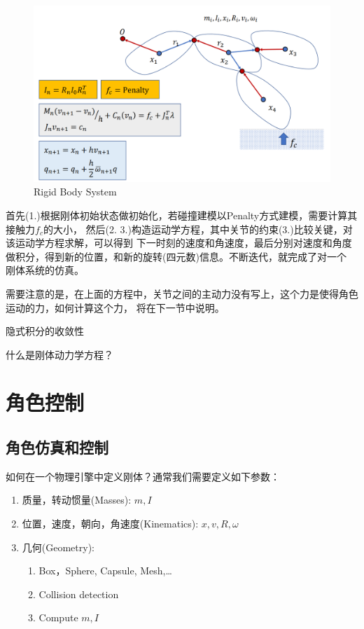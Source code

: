 \documentclass[lang=cn,newtx,10pt,scheme=chinese]{elegantbook}
\begin{document}
\begin{figure}[htbp]
  \centering
  \includegraphics[totalheight=2in]{"./image/RigidBodySystem.png"}
  \caption{Rigid Body System} \label{fig:RigidBodySystem}
\end{figure}
首先(1.)根据刚体初始状态做初始化，若碰撞建模以Penalty方式建模，需要计算其接触力$f_c$的大小，
然后(2. 3.)构造运动学方程，其中关节的约束(3.)比较关键，对该运动学方程求解，可以得到
下一时刻的速度和角速度，最后分别对速度和角度做积分，得到新的位置，和新的旋转(四元数)信息。不断迭代，就完成了对一个
刚体系统的仿真。

需要注意的是，在上面的方程中，关节之间的主动力没有写上，这个力是使得角色运动的力，如何计算这个力，
将在下一节中说明。

\begin{problemset}
  \item 隐式积分的收敛性
  \item 什么是刚体动力学方程？
\end{problemset}

\chapter{角色控制}
\section{角色仿真和控制}
如何在一个物理引擎中定义刚体？通常我们需要定义如下参数：
\begin{enumerate}[itemindent=2em]
  \item 质量，转动惯量(Masses): $m, I$
  \item 位置，速度，朝向，角速度(Kinematics): $x, v, R, \omega$
  \item 几何(Geometry):
  \begin{enumerate}[itemindent=2em]
    \item Box，Sphere, Capsule, Mesh,\dots
    \item Collision detection
    \item Compute $m, I$
  \end{enumerate}
\end{enumerate}
\end{document}

